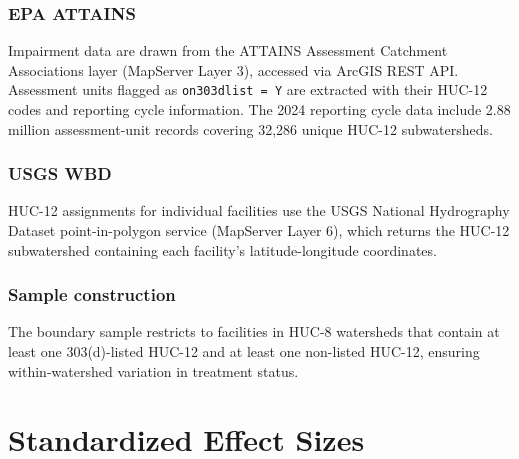 \documentclass[12pt]{article}
\begin{document}
\subsubsection*{EPA ATTAINS} Impairment data are drawn from the ATTAINS Assessment Catchment Associations layer (MapServer Layer 3), accessed via ArcGIS REST API. Assessment units flagged as \texttt{on303dlist = Y} are extracted with their HUC-12 codes and reporting cycle information. The 2024 reporting cycle data include 2.88 million assessment-unit records covering 32,286 unique HUC-12 subwatersheds.

\subsubsection*{USGS WBD} HUC-12 assignments for individual facilities use the USGS National Hydrography Dataset point-in-polygon service (MapServer Layer 6), which returns the HUC-12 subwatershed containing each facility's latitude-longitude coordinates.

\subsubsection*{Sample construction} The boundary sample restricts to facilities in HUC-8 watersheds that contain at least one 303(d)-listed HUC-12 and at least one non-listed HUC-12, ensuring within-watershed variation in treatment status.

\section{Standardized Effect Sizes}
\label{sec:sde}


\end{document}
